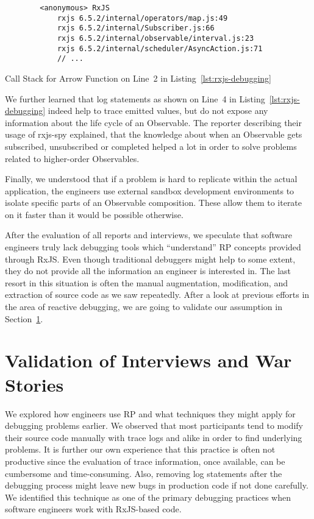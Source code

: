 \documentclass[12pt,a4paper]{article}
\begin{document}
\begin{listing}[H]
	\begin{verbatim}
		<anonymous> RxJS
			rxjs 6.5.2/internal/operators/map.js:49
			rxjs 6.5.2/internal/Subscriber.js:66
			rxjs 6.5.2/internal/observable/interval.js:23
			rxjs 6.5.2/internal/scheduler/AsyncAction.js:71
			// ...
	\end{verbatim}
	\caption{Call Stack for Arrow Function on Line~2 in Listing~\ref{lst:rxjs-debugging}}
	\label{lst:rxjs-call-stack}
\end{listing}

We further learned that log statements as shown on Line~4 in Listing~\ref{lst:rxjs-debugging} indeed help to trace emitted values, but do not expose any information about the life cycle of an Observable. The reporter describing their usage of rxjs-spy explained, that the knowledge about when an Observable gets subscribed, unsubscribed or completed helped a lot in order to solve problems related to higher-order Observables.

Finally, we understood that if a problem is hard to replicate within the actual application, the engineers use external sandbox development environments to isolate specific parts of an Observable composition. These allow them to iterate on it faster than it would be possible otherwise.

After the evaluation of all reports and interviews, we speculate that software engineers truly lack debugging tools which ``understand'' RP concepts provided through RxJS. Even though traditional debuggers might help to some extent, they do not provide all the information an engineer is interested in. The last resort in this situation is often the manual augmentation, modification, and extraction of source code as we saw repeatedly. After a look at previous efforts in the area of reactive debugging, we are going to validate our assumption in Section~\ref{sec:study}.


\section{Validation of Interviews and War Stories}
\label{sec:study}

We explored how engineers use RP and what techniques they might apply for debugging problems earlier. We observed that most participants tend to modify their source code manually with trace logs and alike in order to find underlying problems. It is further our own experience that this practice is often not productive since the evaluation of trace information, once available, can be cumbersome and time-consuming. Also, removing log statements after the debugging process might leave new bugs in production code if not done carefully. We identified this technique as one of the primary debugging practices when software engineers work with RxJS-based code.
\end{document}
